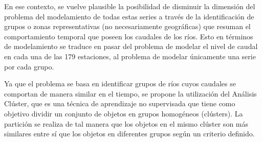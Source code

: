 \documentclass[12pt,oneside]{book}\usepackage[]{graphicx}\usepackage[]{color}
\theoremstyle{definition} %
\begin{document}
En ese contexto, se vuelve plausible la posibilidad de disminuir la dimensión del problema del modelamiento de todas estas series a través de la identificación de grupos o zonas representativas (no necesariamente geográficas) que resuman el comportamiento temporal que poseen los caudales de los ríos. Esto en términos de modelamiento se traduce en pasar del problema de modelar el nivel de caudal en cada una de las 179 estaciones, al problema de modelar únicamente una serie por cada grupo.






Ya que el problema se basa en identificar grupos de ríos cuyos caudales se comportan de manera similar en el tiempo, se propone la utilización del Análisis Clúster, que es una técnica de aprendizaje no supervisada que tiene como objetivo dividir un conjunto de objetos en grupos homogéneos (clústers). La partición se realiza de tal manera que los objetos en el mismo clúster son más similares entre sí que los objetos en diferentes grupos según un criterio definido. 
\end{document}

